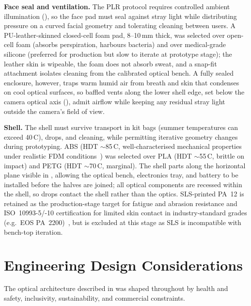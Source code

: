 \textbf{Face seal and ventilation.} The PLR protocol requires controlled ambient illumination (), so the face pad must seal against stray light while distributing pressure on a curved facial geometry and tolerating cleaning between users. A PU-leather-skinned closed-cell foam pad, 8--10\,mm thick, was selected over open-cell foam (absorbs perspiration, harbours bacteria) and over medical-grade silicone (preferred for production but slow to iterate at prototype stage); the leather skin is wipeable, the foam does not absorb sweat, and a snap-fit attachment isolates cleaning from the calibrated optical bench. A fully sealed enclosure, however, traps warm humid air from breath and skin that condenses on cool optical surfaces, so baffled vents along the lower shell edge, set below the camera optical axis (), admit airflow while keeping any residual stray light outside the camera's field of view. 

\textbf{Shell.} The shell must survive transport in kit bags (summer temperatures can exceed 40\,\textdegree C), drops, and cleaning, while permitting iterative geometry changes during prototyping. ABS (HDT $\sim$85\,\textdegree C, well-characterised mechanical properties under realistic FDM conditions~\cite{tymrak2014mechanical}) was selected over PLA (HDT $\sim$55\,\textdegree C, brittle on impact) and PETG (HDT $\sim$70\,\textdegree C, marginal). The shell parts along the horizontal plane visible in , allowing the optical bench, electronics tray, and battery to be installed before the halves are joined; all optical components are recessed within the shell, so drops contact the shell rather than the optics. SLS-printed PA~12 is retained as the production-stage target for fatigue and abrasion resistance and ISO~10993-5/-10 certification for limited skin contact in industry-standard grades (e.g.\ EOS PA~2200)~\cite{eos2024pa2200, bazan2023pa12}, but is excluded at this stage as SLS is incompatible with bench-top iteration.

\section{Engineering Design Considerations}
\label{sec:hw-design-considerations}

The optical architecture described in  was shaped throughout by health and safety, inclusivity, sustainability, and commercial constraints.

